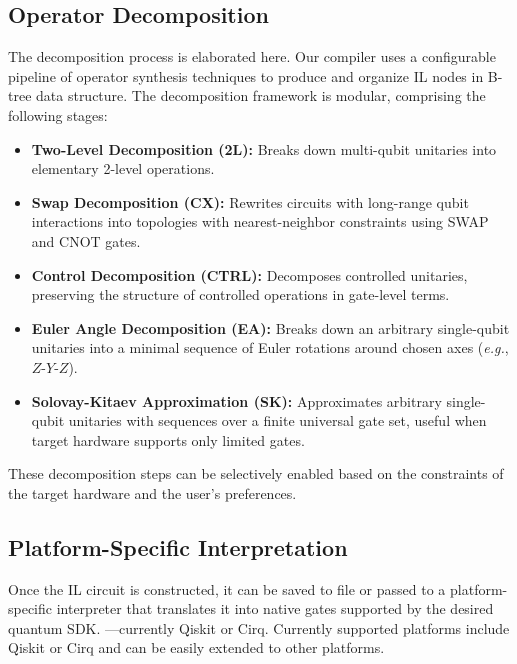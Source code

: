 \documentclass[conference]{IEEEtran}
\begin{document}
    \subsection{Operator Decomposition}\label{subsec:operator-decomposition}

    The decomposition process is elaborated here.
    Our compiler uses a configurable pipeline of operator synthesis techniques to produce and organize IL nodes in B-tree data structure.
    The decomposition framework is modular, comprising the following stages:
    \begin{itemize}
        \item{\textbf{Two-Level Decomposition (2L):} Breaks down multi-qubit unitaries into elementary 2-level operations.}
        \item{\textbf{Swap Decomposition (CX):} Rewrites circuits with long-range qubit interactions into topologies
        with nearest-neighbor constraints using SWAP and CNOT gates.}
        \item{\textbf{Control Decomposition (CTRL):} Decomposes controlled unitaries, preserving
        the structure of controlled operations in gate-level terms.}
        \item{\textbf{Euler Angle Decomposition (EA):} Breaks down an arbitrary single-qubit unitaries into a minimal sequence of Euler rotations
        around chosen axes (\emph{e.g.}, \(Z\)-\(Y\)-\(Z\)).}
        \item{\textbf{Solovay-Kitaev Approximation (SK):} Approximates arbitrary single-qubit unitaries with sequences over a finite universal gate set,
            useful when target hardware supports only limited gates.}~\cite{dawson2005solovaykitaevalgorithm}
    \end{itemize}

    These decomposition steps can be selectively enabled based on the constraints of the target hardware and the user’s preferences.

    \subsection{Platform-Specific Interpretation}\label{subsec:platform-specific-interpret}
    Once the IL circuit is constructed, it can be saved to file or passed to a platform-specific interpreter
    that translates it into native gates supported by the desired quantum SDK.
    —currently Qiskit or Cirq.
    Currently supported platforms include Qiskit or Cirq and can be easily extended to other platforms.
\end{document}
